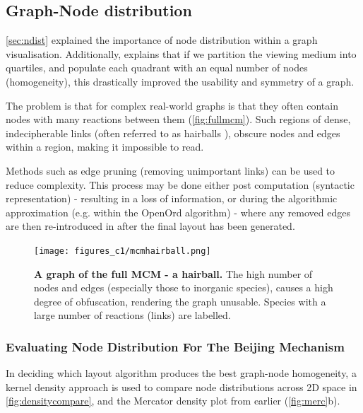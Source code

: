 \subsection{Graph-Node distribution}\label{sec:nodedist}

\autoref{sec:ndist} explained the importance of node distribution within a graph visualisation. Additionally, \cite{ch6graphredability} explains that if we partition the viewing medium into quartiles, and populate each quadrant with an equal number of nodes (homogeneity), this drastically improved the usability and symmetry of a graph.

The problem is that for complex real-world graphs is that they often contain nodes with many reactions between them (\autoref{fig:fullmcm}). Such regions of dense, indecipherable links (often referred to as hairballs \citep{vislarge}), obscure nodes and edges within a region, making it impossible to read.

Methods such as edge pruning \citep{edgeprune} (removing unimportant links) can be used to reduce complexity. This process may be done either post computation (syntactic representation) - resulting in a loss of information, or during the algorithmic approximation (e.g. within the OpenOrd algorithm) - where any removed edges are then re-introduced in after the final layout has been generated.


\begin{figure}[H]
     \centering
     \texttt{[image: figures\_c1/mcmhairball.png]}
        \caption{\textbf{A graph of the full MCM - a hairball.} The high number of nodes and edges (especially those to inorganic species), causes a high degree of obfuscation, rendering the graph unusable. Species with a large number of reactions (links) are labelled.}
        \label{fig:fullmcm}
\end{figure}

\subsubsection{Evaluating Node Distribution For The Beijing Mechanism}\label{sec:evalnd}


In deciding which layout algorithm produces the best graph-node homogeneity, a kernel density approach is used to compare node distributions across 2D space in \autoref{fig:densitycompare}, and the Mercator density plot from earlier (\autoref{fig:merc}b). 

